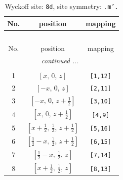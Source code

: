 \documentclass[fleqn,8pt]{jsarticle}
\begin{document}
\begin{longtable}{ccc}
\caption{Wyckoff site: {\tt 8d}, site symmetry: {\tt .m'.}}
 \\
 \hline \hline
No. & position & mapping \\ \hline \endfirsthead

\multicolumn{2}{l}{\tablename\ \thetable{}} \\
 \hline \hline
No. & position & mapping \\ \hline \endhead

 \hline \hline
\multicolumn{2}{r}{\footnotesize\it continued ...} \\ \endfoot

 \hline \hline
\multicolumn{2}{r}{} \\ \endlastfoot

1 & $\left[ x,\, 0,\, z \right]$ & {\tt [1,12]} \\ \hline
2 & $\left[ - x,\, 0,\, z \right]$ & {\tt [2,11]} \\ \hline
3 & $\left[ - x,\, 0,\, z + \frac{1}{2} \right]$ & {\tt [3,10]} \\ \hline
4 & $\left[ x,\, 0,\, z + \frac{1}{2} \right]$ & {\tt [4,9]} \\ \hline
5 & $\left[ x + \frac{1}{2},\, \frac{1}{2},\, z + \frac{1}{2} \right]$ & {\tt [5,16]} \\ \hline
6 & $\left[ \frac{1}{2} - x,\, \frac{1}{2},\, z + \frac{1}{2} \right]$ & {\tt [6,15]} \\ \hline
7 & $\left[ \frac{1}{2} - x,\, \frac{1}{2},\, z \right]$ & {\tt [7,14]} \\ \hline
8 & $\left[ x + \frac{1}{2},\, \frac{1}{2},\, z \right]$ & {\tt [8,13]} \\
\end{longtable}
\renewcommand{\arraystretch}{1.2}
\end{document}
